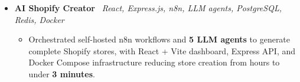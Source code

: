 \documentclass[letterpaper,11pt]{article}
\begin{document}
\begin{itemize}[leftmargin=0.15in, label={}, itemsep=-1pt, topsep=4pt]
    \vspace{-3pt}
    \begin{itemize}[leftmargin=0.3in, label=\textbullet, itemsep=2pt, topsep=2pt]
      \item \small Developed autonomous LTE coverage mapping system integrating RTL-SDR RF scanning, Pixhawk MAVLink GPS telemetry, and Raspberry Pi-based signal logging with \textbf{Google Earth heatmap} visualization.
    \end{itemize}
  \item \noindent\textbf{AI Shopify Creator} \textbar\ {\small\textit{React, Express.js, n8n, LLM agents, PostgreSQL, Redis, Docker}}\\
    \vspace{-3pt}
    \begin{itemize}[leftmargin=0.3in, label=\textbullet, itemsep=2pt, topsep=2pt]
      \item \small Orchestrated self-hosted n8n workflows and \textbf{5 LLM agents} to generate complete Shopify stores, with React + Vite dashboard, Express API, and Docker Compose infrastructure reducing store creation from hours to under \textbf{3 minutes}.
    \end{itemize}
\end{itemize}
\vspace{-15pt}
\end{document}
